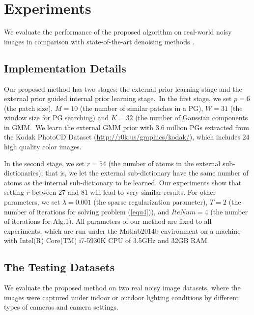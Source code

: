 \documentclass[10pt,twocolumn,letterpaper]{article}
\begin{document}

\section{Experiments}\vspace{-1mm}

We evaluate the performance of the proposed algorithm on real-world noisy images \cite{crosschannel2016,ncwebsite}  in comparison with  state-of-the-art denoising methods \cite{bm3d,cbm3d,mlp,wnnm,csf,chen2015learning,crosschannel2016,noiseclinic,ncwebsite,neatimage}.


\subsection{Implementation Details}\vspace{-1mm}

Our proposed method has two stages: the external prior learning stage and the external prior guided internal prior learning stage.\ In the first stage, we set $p = 6$ (the patch size), $M = 10$ (the number of similar patches in a PG), $W = 31$ (the window size for PG searching) and $K = 32$ (the number of Gaussian components in GMM.\ We learn the external GMM prior with 3.6 million PGs extracted from the Kodak PhotoCD Dataset (\url{http://r0k.us/graphics/kodak/}), which includes 24 high quality color images. 

In the second stage, we set $r = 54$ (the number of atoms in the external sub-dictionaries); that is, we let the external sub-dictionary have the same number of atoms as the internal sub-dictionary to be learned. Our experiments show that setting $r$ between 27 and 81 will lead to very similar results. For other parameters, we set $\lambda=0.001$ (the sparse regularization parameter), $T = 2$ (the number of iterations for solving problem (\ref{equ4})), and $IteNum = 4$ (the number of iterations for Alg.1). All parameters of our method are fixed to all experiments, which are run under the Matlab2014b environment on a machine with Intel(R) Core(TM) i7-5930K CPU of 3.5GHz and 32GB RAM.


\subsection{The Testing Datasets}\vspace{-1mm}

We evaluate the proposed method on two real noisy image datasets, where the images were captured under indoor or outdoor lighting conditions by different types of cameras and camera settings. 
\end{document}

